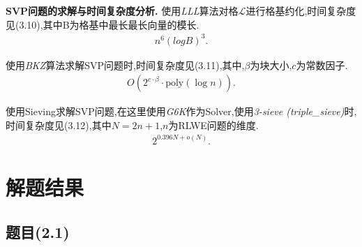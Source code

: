 \documentclass[12pt,a4paper]{article}
\numberwithin{equation}{section}
\begin{document}



\textbf{SVP问题的求解与时间复杂度分析.}
使用\textit{LLL}算法\cite{lenstraFactoringPolynomialsRational1982}对格$\mathcal{L}$进行格基约化,时间复杂度见(3.10),其中B为格基中最长最长向量的模长\cite{adleman1981}.
\begin{align}
n^6 (logB)^3.
\end{align}

使用\textit{BKZ}\cite{chen2011}算法求解SVP问题时,时间复杂度见(3.11),其中,$\beta$为块大小,$c$为常数因子.
\begin{align}
O\left(2^{c \cdot \beta} \cdot \text{poly}(\log n)\right).
\end{align}

使用Sieving求解SVP问题,在这里使用\textit{G6K}\cite{cryptoeprint:2019/089}作为Solver,使用\textit{3-sieve (triple\_sieve)}时,
时间复杂度见(3.12),其中$N=2n+1$,$n$为RLWE问题的维度.
\begin{align}
2^{0.396N+o(N)}.
\end{align}


\section{解题结果}

\subsection{题目(2.1)}
\end{document}
